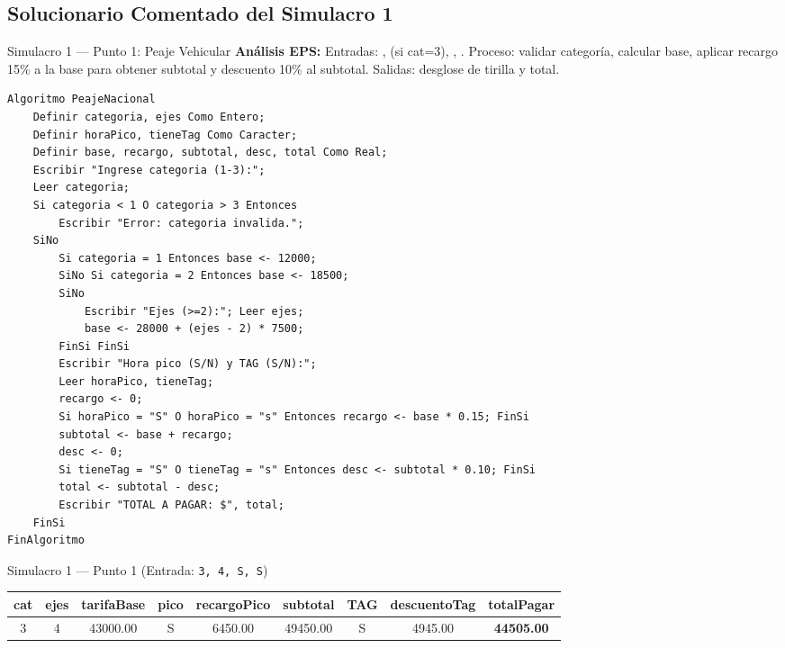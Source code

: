 \documentclass[11pt,letterpaper]{article}
\begin{document}
\subsection{Solucionario Comentado del Simulacro 1}

\begin{solucion}{Simulacro 1 — Punto 1: Peaje Vehicular}
\textbf{Análisis EPS:} Entradas: ,  (si cat=3), , . Proceso: validar categoría, calcular base, aplicar recargo 15\% a la base para obtener subtotal y descuento 10\% al subtotal. Salidas: desglose de tirilla y total.

\begin{lstlisting}[style=pseintmonitoria, caption={Pseudocódigo PSeInt del Punto 1 (Peaje)}]
Algoritmo PeajeNacional
    Definir categoria, ejes Como Entero;
    Definir horaPico, tieneTag Como Caracter;
    Definir base, recargo, subtotal, desc, total Como Real;
    Escribir "Ingrese categoria (1-3):";
    Leer categoria;
    Si categoria < 1 O categoria > 3 Entonces
        Escribir "Error: categoria invalida.";
    SiNo
        Si categoria = 1 Entonces base <- 12000;
        SiNo Si categoria = 2 Entonces base <- 18500;
        SiNo
            Escribir "Ejes (>=2):"; Leer ejes;
            base <- 28000 + (ejes - 2) * 7500;
        FinSi FinSi
        Escribir "Hora pico (S/N) y TAG (S/N):";
        Leer horaPico, tieneTag;
        recargo <- 0;
        Si horaPico = "S" O horaPico = "s" Entonces recargo <- base * 0.15; FinSi
        subtotal <- base + recargo;
        desc <- 0;
        Si tieneTag = "S" O tieneTag = "s" Entonces desc <- subtotal * 0.10; FinSi
        total <- subtotal - desc;
        Escribir "TOTAL A PAGAR: $", total;
    FinSi
FinAlgoritmo
\end{lstlisting}
\end{solucion}



\begin{pruebaescritorio}{Simulacro 1 — Punto 1 (Entrada: \texttt{3, 4, S, S})}
\begin{center}
\small
\begin{tabular}{ccccccccc}
\toprule
\textbf{cat} & \textbf{ejes} & \textbf{tarifaBase} & \textbf{pico} & \textbf{recargoPico} & \textbf{subtotal} & \textbf{TAG} & \textbf{descuentoTag} & \textbf{totalPagar} \\
\midrule
3 & 4 & 43000.00 & S & 6450.00 & 49450.00 & S & 4945.00 & \textbf{44505.00} \\
\bottomrule
\end{tabular}
\end{center}
\end{pruebaescritorio}
\end{document}
